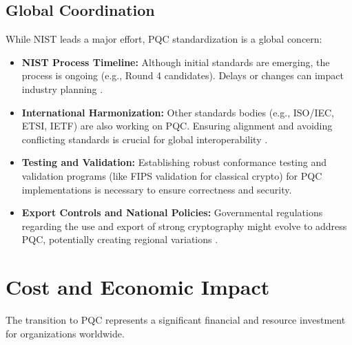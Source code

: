 \subsection{Global Coordination}\label{subsec:global_coord_ch7_rev}
While NIST leads a major effort, PQC standardization is a global concern:
\begin{itemize}
    \item \textbf{NIST Process Timeline:} Although initial standards are emerging, the process is ongoing (e.g., Round 4 candidates). Delays or changes can impact industry planning \parencite{nist_pqc_status_2024}.
    \item \textbf{International Harmonization:} Other standards bodies (e.g., ISO/IEC, ETSI, IETF) are also working on PQC. Ensuring alignment and avoiding conflicting standards is crucial for global interoperability \parencite{pqc_standards_cooperation}.
    \item \textbf{Testing and Validation:} Establishing robust conformance testing and validation programs (like FIPS validation for classical crypto) for PQC implementations is necessary to ensure correctness and security.
    \item \textbf{Export Controls and National Policies:} Governmental regulations regarding the use and export of strong cryptography might evolve to address PQC, potentially creating regional variations \parencite{crypto_export_controls}.
\end{itemize}

\section{Cost and Economic Impact}\label{sec:costs_ch7_rev}
The transition to PQC represents a significant financial and resource investment for organizations worldwide.

